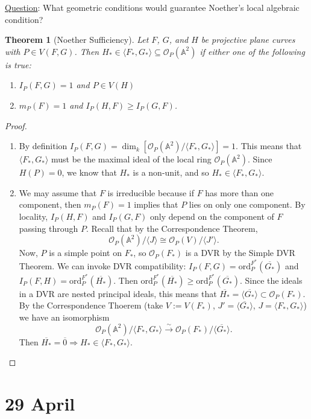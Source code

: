 \documentclass[12pt]{article}
\newcommand{\vbrack}[1]{\langle #1\rangle}
\newtheorem{theorem}{Theorem}[section]
\theoremstyle{definition}
\begin{document}
\underline{Question}: What geometric conditions would guarantee Noether's local algebraic condition?
\begin{theorem}[Noether Sufficiency]
    Let $F$, $G$, and $H$ be projective plane curves with $P\in V(F,G)$. Then $H_*\in\vbrack{F_*,G_*}\subseteq\mathcal{O}_P(\mathbb{A}^2)$ if either one of the following is true:
    \begin{enumerate}
        \item $I_P(F,G)=1$ and $P\in V(H)$
        \item $m_P(F)=1$ and $I_P(H,F)\geq I_P(G,F)$.
    \end{enumerate}
\end{theorem}
\begin{proof}
\begin{enumerate}
    \item By definition $I_P(F,G)=\dim_k[\mathcal{O}_P(\mathbb{A}^2)/\vbrack{F_*,G_*}]=1$. This means that $\vbrack{F_*,G_*}$ must be the maximal ideal of the local ring $\mathcal{O}_P(\mathbb{A}^2)$. Since $H(P)=0$, we know that $H_*$ is a non-unit, and so $H_*\in\vbrack{F_*,G_*}$. \checkmark
    \item We may assume that $F$ is irreducible because if $F$ has more than one component, then $m_P(F)=1$ implies that $P$ lies on only one component. By locality, $I_P(H,F)$ and $I_P(G,F)$ only depend on the component of $F$ passing through $P$. Recall that by the Correspondence Theorem,
    \[\mathcal{O}_P(\mathbb{A}^2)/\vbrack{J}\cong\mathcal{O}_P(V)/\vbrack{J'}.\]
    Now, $P$ is a simple point on $F_*$, so $\mathcal{O}_P(F_*)$ is a DVR by the Simple DVR Theorem. We can invoke DVR compatibility: $I_P(F,G)=\mathrm{ord}_P^{F^*}(\overline{G_*})$ and $I_P(F,H)=\mathrm{ord}_P^{F^*}(\overline{H_*})$. Then $\mathrm{ord}_P^{F^*}(\overline{H_*})\geq\mathrm{ord}_P^{F^*}(\overline{G_*})$. Since the ideals in a DVR are nested principal ideals, this means that $\overline{H_*}=\vbrack{\overline{G_*}}\subset\mathcal{O}_P(F_*)$. By the Correspondence Thoerem (take $V:=V(F_*)$, $J'=\vbrack{\overline{G_*}}$, $J=\vbrack{F_*,G_*}$) we have an isomorphism
    \[\mathcal{O}_P(\mathbb{A}^2)/\vbrack{F_*,G_*}\stackrel{\sim}{\longrightarrow}\mathcal{O}_P(F_*)/\vbrack{\overline{G_*}}.\]
    Then $\overline{H_*}=\overline{0}\Rightarrow H_*\in\vbrack{F_*,G_*}$. \checkmark
\end{enumerate}
\end{proof}
\section{29 April}
\end{document}

